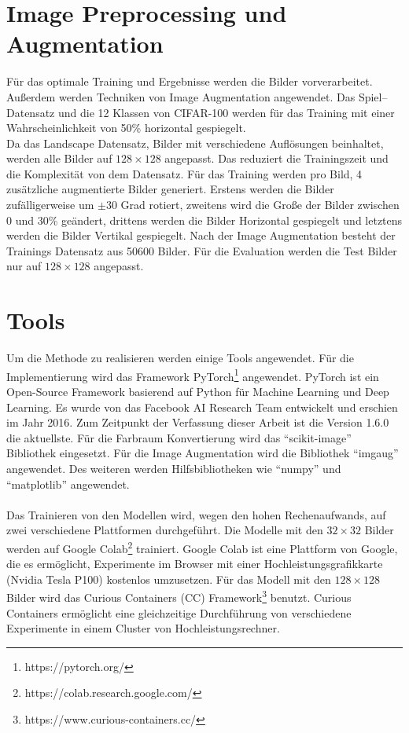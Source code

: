 \section{Image Preprocessing und Augmentation}
Für das optimale Training und Ergebnisse werden die Bilder vorverarbeitet. Außerdem werden Techniken von Image Augmentation angewendet.
Das Spiel–Datensatz und die 12 Klassen von CIFAR-100 werden für das Training mit einer Wahrscheinlichkeit von 50\% horizontal gespiegelt.
\\
Da das Landscape Datensatz, Bilder mit verschiedene Auflösungen beinhaltet, werden alle Bilder auf $ 128 \times 128 $ angepasst. Das 
reduziert die Trainingszeit und die Komplexität von dem Datensatz. 
Für das Training werden pro Bild, 4 zusätzliche augmentierte Bilder generiert. Erstens werden die Bilder zufälligerweise um $\pm 30$ Grad rotiert,
zweitens wird die Große der Bilder zwischen 0 und 30\% geändert, drittens werden die Bilder Horizontal gespiegelt und letztens werden die 
Bilder Vertikal gespiegelt. Nach der Image Augmentation besteht der Trainings Datensatz aus 50600 Bilder.
Für die Evaluation werden die Test Bilder nur auf $ 128 \times 128 $ angepasst.

\section{Tools}
Um die Methode zu realisieren werden einige Tools angewendet. Für die Implementierung wird das Framework 
PyTorch\footnote{https://pytorch.org/}\label{tool:pytorch} angewendet. PyTorch ist ein Open-Source Framework basierend auf Python für Machine Learning und 
Deep Learning. Es wurde von das Facebook AI Research Team entwickelt und erschien im Jahr 2016. Zum Zeitpunkt der Verfassung dieser Arbeit ist 
die Version 1.6.0 die aktuellste. Für die Farbraum Konvertierung wird das ``scikit-image'' Bibliothek eingesetzt. Für die Image Augmentation 
wird die Bibliothek ``imgaug'' angewendet. Des weiteren werden Hilfsbibliotheken wie ``numpy'' und ``matplotlib'' angewendet.
\\
\\
Das Trainieren von den Modellen wird, wegen den hohen Rechenaufwands, auf zwei verschiedene Plattformen durchgeführt. Die Modelle mit den
$32 \times 32$ Bilder werden auf Google Colab\footnote{https://colab.research.google.com/} trainiert. Google Colab ist eine Plattform von 
Google, die es ermöglicht, Experimente im Browser mit einer Hochleistungsgrafikkarte (Nvidia Tesla P100) kostenlos umzusetzen. Für das Modell mit den 
$128 \times 128$ Bilder
wird das Curious Containers (CC) Framework\footnote{https://www.curious-containers.cc/} benutzt. Curious Containers ermöglicht eine 
gleichzeitige Durchführung von verschiedene Experimente in einem Cluster von Hochleistungsrechner.


